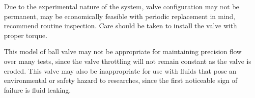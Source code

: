 \documentclass[]{article}
\begin{document}
Due to the experimental nature of the system, valve configuration may not be permanent, may be economically feasible with periodic replacement in mind, recommend routine inspection. Care should be taken to install the valve with proper torque.

This model of ball valve may not be appropriate for maintaining precision flow over many tests, since the valve throttling will not remain constant as the valve is eroded. This valve may also be inappropriate for use with fluids that pose an environmental or safety hazard to researches, since the first noticeable sign of failure is fluid leaking. 
\end{document}
